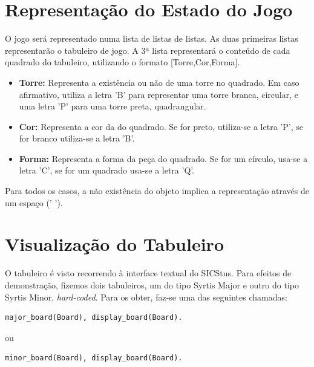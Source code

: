 \documentclass[a4paper]{article}
\begin{document}
\section{Representação do Estado do Jogo}

O jogo será representado numa lista de listas de listas. As duas primeiras listas representarão o tabuleiro de jogo. A 3ª lista representará o conteúdo de cada quadrado do tabuleiro, utilizando o formato [Torre,Cor,Forma].

\begin{itemize}
\item \textbf{Torre:} Representa a existência ou não de uma torre no quadrado. Em caso afirmativo, utiliza a letra 'B' para representar uma torre branca, circular, e uma letra 'P' para uma torre preta, quadrangular.
\item \textbf{Cor:} Representa a cor da do quadrado. Se for preto, utiliza-se a letra 'P', se for branco utiliza-se a letra 'B'.
\item \textbf{Forma:} Representa a forma da peça do quadrado. Se for um círculo, usa-se a letra 'C', se for um quadrado usa-se a letra 'Q'.
\end{itemize}

Para todos os casos, a não existência do objeto implica a representação através de um espaço (' ').




\section{Visualização do Tabuleiro}

O tabuleiro é visto recorrendo à interface textual do SICStus. Para efeitos de demonstração, fizemos dois tabuleiros, um do tipo Syrtis Major e outro do tipo Syrtis Minor, \textit{hard-coded}. Para os obter, faz-se uma das seguintes chamadas:

\begin{lstlisting}
major_board(Board), display_board(Board).
\end{lstlisting}

ou

\begin{lstlisting}
minor_board(Board), display_board(Board).
\end{lstlisting}
\end{document}
